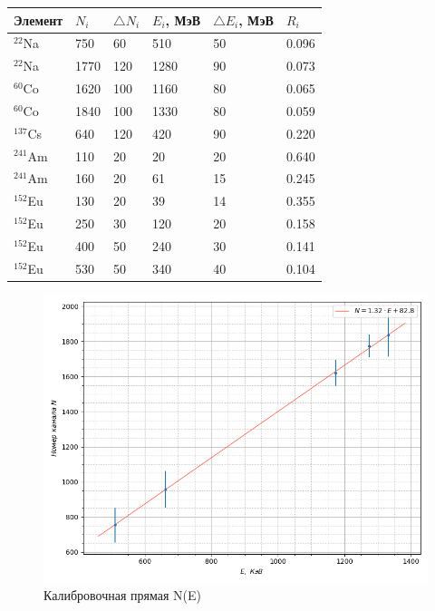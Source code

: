 \documentclass{article}
\begin{document}
\begin{enumerate}
\begin{table}[h!]
\begin{tabular}{|l|l|l|l|l|l|}
\hline
Элемент    & $N_i$ & $\triangle N_i$ & $E_i$, МэВ & $\triangle E_i$, МэВ & $R_i$ \\ \hline
$^{22}$Na  & 750   & 60              & 510        & 50                   & 0.096 \\ \hline
$^{22}$Na  & 1770  & 120             & 1280       & 90                   & 0.073 \\ \hline
$^{60}$Co  & 1620  & 100             & 1160       & 80                   & 0.065 \\ \hline
$^{60}$Co  & 1840  & 100             & 1330       & 80                   & 0.059 \\ \hline
$^{137}$Cs & 640   & 120             & 420        & 90                   & 0.220 \\ \hline
$^{241}$Am & 110   & 20              & 20         & 20                   & 0.640 \\ \hline
$^{241}$Am & 160   & 20              & 61         & 15                   & 0.245 \\ \hline
$^{152}$Eu & 130   & 20              & 39         & 14                   & 0.355 \\ \hline
$^{152}$Eu & 250   & 30              & 120        & 20                   & 0.158 \\ \hline
$^{152}$Eu & 400   & 50              & 240        & 30                   & 0.141 \\ \hline
$^{152}$Eu & 530   & 50              & 340        & 40                   & 0.104 \\ \hline
\end{tabular}
        \label{table all calc E(N)}
    \end{table}


\begin{figure}[h!]
        \centering
        \includegraphics[width = 12 cm]{N(E).png}
        \caption{Калибровочная прямая N(E)}
        \label{calib}
    \end{figure}




\end{enumerate}
\end{document}
